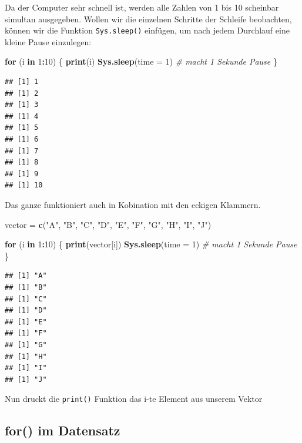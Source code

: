 \documentclass[
]{book}
\newenvironment{Shaded}{\begin{snugshade}}{\end{snugshade}}
\newcommand{\AttributeTok}[1]{\textcolor[rgb]{0.13,0.29,0.53}{#1}}
\newcommand{\CommentTok}[1]{\textcolor[rgb]{0.56,0.35,0.01}{\textit{#1}}}
\newcommand{\ControlFlowTok}[1]{\textcolor[rgb]{0.13,0.29,0.53}{\textbf{#1}}}
\newcommand{\DecValTok}[1]{\textcolor[rgb]{0.00,0.00,0.81}{#1}}
\newcommand{\FunctionTok}[1]{\textcolor[rgb]{0.13,0.29,0.53}{\textbf{#1}}}
\newcommand{\NormalTok}[1]{#1}
\newcommand{\OtherTok}[1]{\textcolor[rgb]{0.56,0.35,0.01}{#1}}
\newcommand{\SpecialCharTok}[1]{\textcolor[rgb]{0.81,0.36,0.00}{\textbf{#1}}}
\newcommand{\StringTok}[1]{\textcolor[rgb]{0.31,0.60,0.02}{#1}}
\begin{document}
Da der Computer sehr schnell ist, werden alle Zahlen von 1 bis 10 scheinbar simultan ausgegeben. Wollen wir die einzelnen Schritte der Schleife beobachten, können wir die Funktion \texttt{Sys.sleep()} einfügen, um nach jedem Durchlauf eine kleine Pause einzulegen:

\begin{Shaded}
\begin{Highlighting}[]
\ControlFlowTok{for}\NormalTok{ (i }\ControlFlowTok{in} \DecValTok{1}\SpecialCharTok{:}\DecValTok{10}\NormalTok{) \{}
  \FunctionTok{print}\NormalTok{(i)}
  \FunctionTok{Sys.sleep}\NormalTok{(}\AttributeTok{time =} \DecValTok{1}\NormalTok{) }\CommentTok{\# macht 1 Sekunde Pause}
\NormalTok{\}}
\end{Highlighting}
\end{Shaded}

\begin{verbatim}
## [1] 1
## [1] 2
## [1] 3
## [1] 4
## [1] 5
## [1] 6
## [1] 7
## [1] 8
## [1] 9
## [1] 10
\end{verbatim}

Das ganze funktioniert auch in Kobination mit den eckigen Klammern.

\begin{Shaded}
\begin{Highlighting}[]
\NormalTok{vector }\OtherTok{=} \FunctionTok{c}\NormalTok{(}\StringTok{"A"}\NormalTok{, }\StringTok{"B"}\NormalTok{, }\StringTok{"C"}\NormalTok{, }\StringTok{"D"}\NormalTok{, }\StringTok{"E"}\NormalTok{, }\StringTok{"F"}\NormalTok{, }\StringTok{"G"}\NormalTok{, }\StringTok{"H"}\NormalTok{, }\StringTok{"I"}\NormalTok{, }\StringTok{"J"}\NormalTok{)}

\ControlFlowTok{for}\NormalTok{ (i }\ControlFlowTok{in} \DecValTok{1}\SpecialCharTok{:}\DecValTok{10}\NormalTok{) \{}
  \FunctionTok{print}\NormalTok{(vector[i])}
  \FunctionTok{Sys.sleep}\NormalTok{(}\AttributeTok{time =} \DecValTok{1}\NormalTok{) }\CommentTok{\# macht 1 Sekunde Pause}
\NormalTok{\}}
\end{Highlighting}
\end{Shaded}

\begin{verbatim}
## [1] "A"
## [1] "B"
## [1] "C"
## [1] "D"
## [1] "E"
## [1] "F"
## [1] "G"
## [1] "H"
## [1] "I"
## [1] "J"
\end{verbatim}

Nun druckt die \texttt{print()} Funktion das i-te Element aus unserem Vektor

\subsection{for() im Datensatz}\label{for-im-datensatz}
\end{document}
